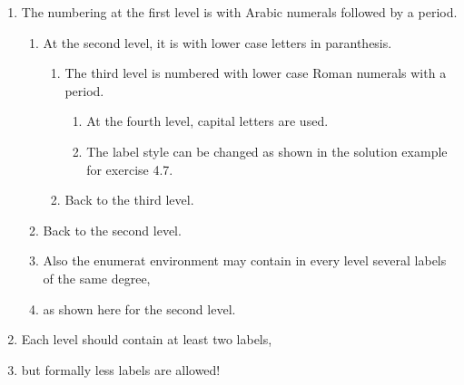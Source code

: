 \documentclass{article}
\begin{document}
\begin{enumerate}
  \item The numbering at the first level is with Arabic numerals followed
        by a period.
  \begin{enumerate}
    \item At the second level, it is with lower case letters in paranthesis.
    \begin{enumerate}
      \item The third level is numbered with lower case Roman numerals
            with a period.
      \begin{enumerate}
        \item At the fourth level, capital letters are used.
        \item The label style can be changed as shown in the solution
              example for exercise 4.7.
      \end{enumerate}
      \item Back to the third level.
    \end{enumerate}
    \item Back to the second level.
    \item Also the enumerat environment may contain in every level
          several labels of the same degree,
    \item as shown here for the second level.
  \end{enumerate}
  \item Each level should contain at least two labels,
  \item but formally less labels are allowed!
\end{enumerate}                   
\end{document}
